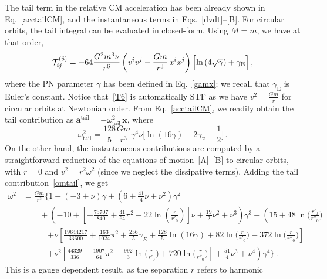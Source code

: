 \documentclass[prd,preprint,superscriptaddress,tightenlines,nofootinbib,
  eqsecnum,showpacs]{revtex4}
\begin{document}
The tail term in the relative CM acceleration has been already shown in
Eq.~\eqref{acctailCM}, and the instantaneous terms in
Eqs.~\eqref{dvdt}--\eqref{B}. For circular orbits, the tail integral can be
evaluated in closed-form. Using $M=m$, we have at that order,
%
\begin{equation}\label{T6}
\mathcal{T}_{ij}^{(6)} = -64\frac{G^2m^3\nu}{r^6}\left(v^iv^j-\frac{G
  m}{r^3}\,x^ix^j\right)\Bigl[\ln\left(4\sqrt{\gamma}\right) +
  \gamma_\text{E}\Bigr]\,,
\end{equation}
%
where the PN parameter $\gamma$ has been defined in Eq.~\eqref{gamx}; we
recall that $\gamma_\text{E}$ is Euler's constant. Notice
that~\eqref{T6} is automatically STF as we have $v^2=\frac{G m}{r}$ for
circular orbits at Newtonian order. From Eq.~\eqref{acctailCM}, we readily
obtain the tail contribution as
$\bm{a}^\text{tail} = - \omega^2_\text{tail} \,\bm{x}$, where
%
\begin{equation}\label{omtail}
\omega^2_\text{tail} = \frac{128}{5}\frac{G
    m}{r^3}\gamma^4\nu\biggl[\ln\left(16 \gamma\right) +
    2\gamma_\text{E} + \frac{1}{2}\biggr]\,.
\end{equation}
%
On the other hand, the instantaneous contributions are computed by a
straightforward reduction of the equations of motion~\eqref{A}--\eqref{B} to
circular orbits, with $\dot{r}=0$ and $v^2=r^2\omega^2$ (since we neglect the
dissipative terms). Adding the tail contribution~\eqref{omtail}, we
get
%
\begin{align}\label{keplerlaw}
 \omega^2 &= \frac{G m}{r^3} \bigg\{ 1+(-3+\nu) \gamma + \left( 6 +
  \frac{41}{4}\nu + \nu^2 \right) \gamma^2 \nonumber\\ & \quad\quad +
  \left( -10 + \left[- \frac{75707}{840} + \frac{41}{64} \pi^2 + 22
    \ln \left( \frac{r}{r'_0}\right) \right]\nu + \frac{19}{2}\nu^2 +
  \nu^3 \right) \gamma^3 +
  \left(15+ 48 \ln\Big(\frac{r'_0}{r''_{0}}\Big) \right. \nonumber\\
  & \quad\quad\quad
\left. + \nu \left[\frac{19644217}{33600} + \frac{163}{1024} \pi^2
+ \frac{256}{5} \gamma_E + \frac{128}{5} \ln (16 \gamma ) 
+ 82 \ln\Big(\frac{r}{r'_{0}}\Big) - 
372 \ln\Big(\frac{r}{r''_{0}}\Big)\right] \right.\nonumber\\
&\quad\quad\quad \left.  + \nu^2 \left[\frac{44329}{336} 
-  \frac{1907}{64} \pi^2 -  \frac{992}{3} \ln\Big(\frac{r}{r'_{0}}\Big) 
+ 720 \ln\Big(\frac{r}{r''_{0}}\Big)\right] + \frac{51}{4} \nu^3 
+ \nu^4 \right)\gamma^4\biggr\}\,.
\end{align}
%
This is a gauge dependent result, as the separation $r$ refers to harmonic
\end{document}
